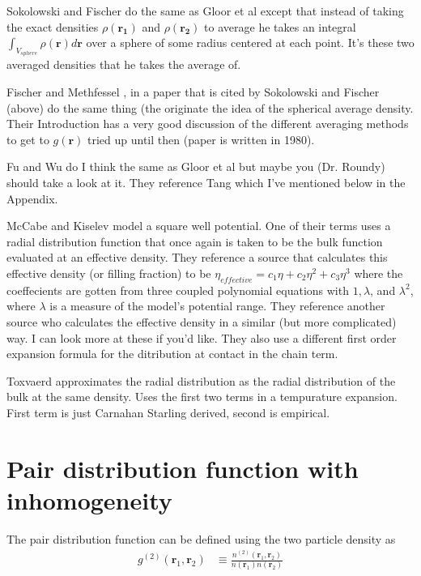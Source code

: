\documentclass[letterpaper,twocolumn,amsmath,amssymb,pre]{revtex4-1}
\newcommand{\rr}{\textbf{r}}
\begin{document}
Sokolowski and Fischer \cite{sokolowski1992role} do the same as Gloor et al except that instead of
taking the exact densities $\rho(\mathbf{r_1})$ and $\rho(\mathbf{r_2})$ to
average he takes an integral $\int_{V_{sphere}} \rho(\mathbf{r})d\mathbf{r}$
over a sphere of some radius centered at each point.  It's
these two averaged densities that he takes the average of.

Fischer and Methfessel \cite{fischer1980born}, in a paper that is cited by Sokolowski and Fischer (above) do the same thing (the originate the idea of the spherical average density.  Their Introduction has a very good discussion of the different averaging methods to get to $g(\mathbf{r})$ tried up until then (paper is written in 1980).

Fu and Wu \cite{fu2005vapor} do I think the same as Gloor et al but maybe you (Dr. Roundy)
should take a look at it.  They reference Tang \cite{tang2008accurate} which I've
mentioned below in the Appendix.

McCabe and Kiselev \cite{mccabe2004application} model a square well potential.  One of their terms uses a radial
distribution function that once again is taken to be the bulk function evaluated at an
effective density.  They reference a source that calculates this effective density (or filling fraction) to be
$\eta_{effective} = c_1\eta + c_2\eta^2 + c_3\eta^3$ where the coeffecients are gotten
from three coupled polynomial equations with $1,\lambda$, and $\lambda^2$, where $\lambda$
is a measure of the model's potential range.  They reference another source who calculates
the effective density in a similar (but more complicated) way.  I can look more at these
if you'd like.  They also use a different first order expansion formula for the ditribution
at contact in the chain term.


Toxvaerd \cite{toxvaerd1976hydrostatic}approximates the radial distribution as the radial distribution
of the bulk at the same density.  Uses the first two terms in a tempurature
expansion.  First term is just Carnahan Starling derived, second is empirical.


\section{Pair distribution function with inhomogeneity}

The pair distribution function can be defined using the two particle
density as
\begin{align}
  g^{(2)}(\rr_1,\rr_2) &\equiv \frac{n^{(2)}(\rr_1,\rr_2)}{n(\rr_1)n(\rr_2)}
\end{align}
\end{document}
